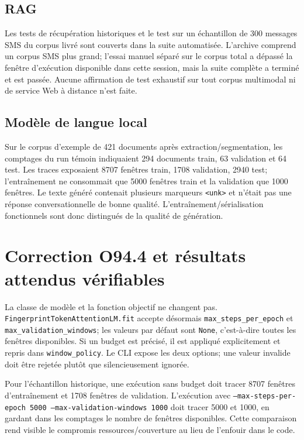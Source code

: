 \documentclass[11pt,a4paper]{article}
\begin{document}
\subsection{RAG}
Les tests de récupération historiques et le test sur un échantillon de 300 messages SMS du corpus livré sont couverts dans la suite automatisée. L'archive comprend un corpus SMS plus grand; l'essai manuel séparé sur le corpus total a dépassé la fenêtre d'exécution disponible dans cette session, mais la suite complète a terminé et est passée. Aucune affirmation de test exhaustif sur tout corpus multimodal ni de service Web à distance n'est faite.

\subsection{Modèle de langue local}
Sur le corpus d'exemple de 421 documents après extraction/segmentation, les comptages du run témoin indiquaient 294 documents train, 63 validation et 64 test. Les traces exposaient 8707 fenêtres train, 1708 validation, 2940 test; l'entraînement ne consommait que 5000 fenêtres train et la validation que 1000 fenêtres. Le texte généré contenait plusieurs marqueurs \texttt{<unk>} et n'était pas une réponse conversationnelle de bonne qualité. L'entraînement/sérialisation fonctionnels sont donc distingués de la qualité de génération.

\section{Correction O94.4 et résultats attendus vérifiables}
La classe de modèle et la fonction objectif ne changent pas. \texttt{FingerprintTokenAttentionLM.fit} accepte désormais \texttt{max\_steps\_per\_epoch} et \texttt{max\_validation\_windows}; les valeurs par défaut sont \texttt{None}, c'est-à-dire toutes les fenêtres disponibles. Si un budget est précisé, il est appliqué explicitement et repris dans \texttt{window\_policy}. Le CLI expose les deux options; une valeur invalide doit être rejetée plutôt que silencieusement ignorée.

Pour l'échantillon historique, une exécution sans budget doit tracer 8707 fenêtres d'entraînement et 1708 fenêtres de validation. L'exécution avec \texttt{--max-steps-per-epoch 5000 --max-validation-windows 1000} doit tracer 5000 et 1000, en gardant dans les comptages le nombre de fenêtres disponibles. Cette comparaison rend visible le compromis ressources/couverture au lieu de l'enfouir dans le code.
\end{document}
